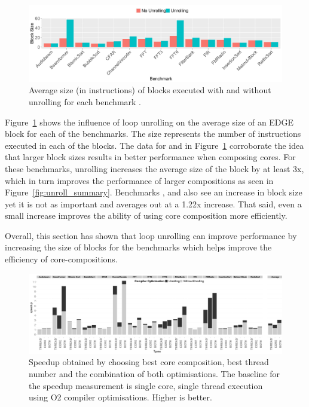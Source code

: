 \begin{figure}[t]
  \includegraphics[width=1\textwidth]{streamit-paper/graphics/unrolling_size.pdf}  \vspace{-2em}

  \caption{Average size (in instructions) of blocks executed with and without unrolling for each benchmark .}\label{fig:unroll_size}  \vspace{-1em}

\end{figure}



Figure~\ref{fig:unroll_size} shows the influence of loop unrolling on the average size of an EDGE block for each of the benchmarks.
The size represents the number of instructions executed in each of the blocks.
The data for  and  in Figure~\ref{fig:unroll_size} corroborate the idea that larger block sizes results in better performance when composing cores.
For these benchmarks, unrolling increases the average size of the block by at least 3x, which in turn improves the performance of larger compositions as seen in Figure~\ref{fig:unroll_summary}.
Benchmarks ,  and  also see an increase in block size yet it is not as important and averages out at a 1.22x increase.
That said, even a small increase improves the ability of using core composition more efficiently.

Overall, this section has shown that loop unrolling can improve performance by increasing the size of blocks for the benchmarks which helps improve the efficiency of core-compositions.

\begin{figure}[t]%
    \includegraphics[width=1\linewidth,keepaspectratio]{streamit-paper/graphics/threadcompbench.pdf}
    \caption{Speedup obtained by choosing best core composition, best
      thread number and the combination of both optimisations. The baseline for the speedup measurement is single core, single thread execution using O2 compiler optimisations. Higher
      is better.}\label{fig:overviewhist}
\end{figure}
